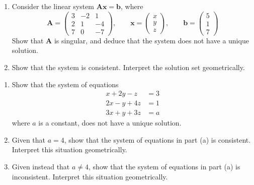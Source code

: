 \documentclass[leqno]{article}
\begin{document}
\djsFrontMatter
\begin{enumerate}[
  label=\textbf{\arabic*.},
  leftmargin=*,
  topsep=0pt,
  partopsep=0pt,
  parsep=0pt
]

\questionitem

\begin{enumerate}[label=\textbf{(\alph*)}]
  \item Consider the linear system $\mathbf{A}\mathbf{x}=\mathbf{b}$, where
  \[
  \mathbf{A}=\begin{pmatrix}
  3&-2&1\\
  2&1&-4\\
  7&0&-7
  \end{pmatrix},
  \qquad
  \mathbf{x}=\begin{pmatrix}x\\y\\z\end{pmatrix},
  \qquad
  \mathbf{b}=\begin{pmatrix}5\\1\\7\end{pmatrix}
  \]
  Show that $\mathbf{A}$ is singular, and deduce that the system does not have a unique solution. \\
  
  \item Show that the system is consistent. Interpret the solution set geometrically.  \\
\end{enumerate}

\newpage

\questionitem

\begin{enumerate}[label=\textbf{(\alph*)}]
  \item Show that the system of equations
  \[
  \begin{aligned}
  x+2y-z&=3\\
  2x-y+4z&=1\\
  3x+y+3z&=a
  \end{aligned}
  \]
  where $a$ is a constant, does not have a unique solution. \\
  \item Given that $a=4$, show that the system of equations in part (a) is consistent. Interpret this situation geometrically.  \\
  \item Given instead that $a\ne 4$, show that the system of equations in part (a) is inconsistent. Interpret this situation geometrically.  \\
\end{enumerate}


\end{enumerate}
\end{document}
